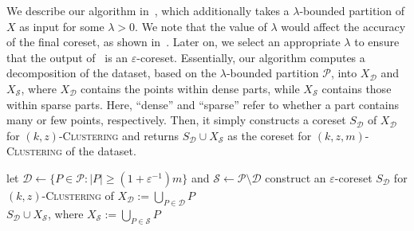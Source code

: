 \documentclass[letterpaper,11pt]{article}
\theoremstyle{plain}
\theoremstyle{definition}
\theoremstyle{remark}
\newcommand{\eps}{\varepsilon}
\newcommand{\calD}{\mathcal{D}}
\newcommand{\calP}{\mathcal{P}}
\newcommand{\calS}{\mathcal{S}}
\newcommand{\ProblemName}[1]{\textsc{#1}}
\newcommand{\kzC}{\ProblemName{$(k,z)$-Clustering}\xspace}
\newcommand{\kzmC}{\ProblemName{$(k,z,m)$-Clustering}\xspace}
\begin{document}
We describe our algorithm in~, which additionally takes a $\lambda$-bounded partition of $X$ as input for some $\lambda > 0$. We note that the value of $\lambda$ would affect the accuracy of the final coreset, as shown in~. Later on, we select an appropriate $\lambda$ to ensure that the output of~ is an $\eps$-coreset.
Essentially, our algorithm computes a decomposition of the dataset, based on the $\lambda$-bounded partition $\calP$, into $X_{\calD}$ and $X_{\calS}$, where $X_{\calD}$ contains the points within dense parts, while $X_\calS$ contains those within sparse parts.
Here, ``dense'' and ``sparse'' refer to whether a part contains many or few points, respectively.
Then, it simply constructs a coreset $S_{\calD}$ of $X_{\calD}$ for \kzC and returns $S_{\calD} \cup X_{\calS}$ as the coreset for \kzmC of the dataset.


\begin{algorithm}
    \caption{Coreset construction for \kzmC of $X$ based on bounded partition}
    \label{alg:construction based on bounded partition}
    \begin{algorithmic}[1]
        \Require{a $\lambda$-bounded partition $\calP$ of $X$}
        \State let $\calD\gets\{P\in\calP: |P|\ge (1+\eps^{-1})m\}$ and $\calS\gets \calP\setminus\calD$ \label{alg 1 line:decomposition}
        \State construct an $\eps$-coreset $S_{\calD}$ for \kzC of $X_{\calD}:=\bigcup_{P\in\calD} P$ \label{alg 1 line:coreset for dense subset}
        \\
        \Return $S_{\calD}\cup X_{\calS}$, where $X_{\calS}:=\bigcup_{P\in\calS} P$ 
    \end{algorithmic}
\end{algorithm}
\end{document}
